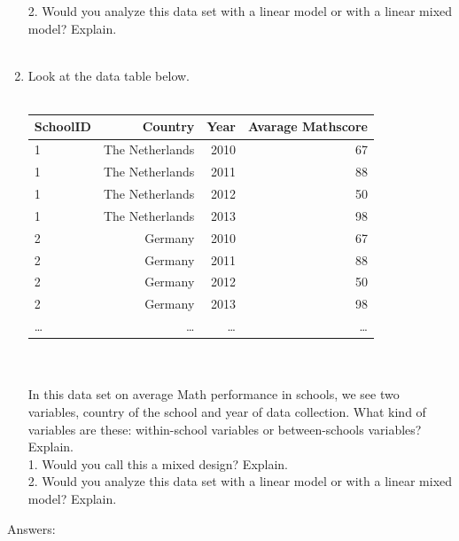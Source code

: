 \documentclass[]{report}\usepackage[]{graphicx}\usepackage[]{color}
\begin{document}
\begin{enumerate}
2. Would you analyze this data set with a linear model or with a linear mixed model? Explain.\\
\\
\item Look at the data table below.
\\
 \\
 \begin{tabular}{lrrr}
  SchoolID & Country & Year & Avarage Mathscore  \\ \hline
 1   & The Netherlands      &  2010 & 67   \\
 1   &  The Netherlands     &  2011 & 88   \\
 1    & The Netherlands         &  2012 & 50   \\
 1   &  The Netherlands        &  2013 & 98  \\
 2   & Germany      &  2010 & 67   \\
 2   &  Germany     &  2011 & 88   \\
 2    & Germany         &  2012 & 50   \\
 2   &  Germany        &  2013 & 98  \\
  \dots   & \dots        &  \dots & \dots  \\
 \end{tabular}
\\
\\
In this data set on average Math performance in schools, we see two variables, country of the school and year of data collection. What kind of variables are these: within-school variables or between-schools variables? Explain.\\
1. Would you call this a mixed design? Explain.\\
2. Would you analyze this data set with a linear model or with a linear mixed model? Explain.\\

\end{enumerate}


Answers:
\end{document}
